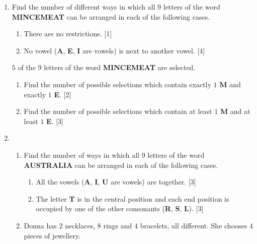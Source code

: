 	
\begin{enumerate}
	
	
	\item Find the number of different ways in which all $9$ letters of the word \textbf{MINCEMEAT} can be arranged in	each of the following cases. 
	\begin{enumerate}[label=(\roman*)]
		\item There are no restrictions.  \hfill[1]
		\item No vowel (\textbf{A}, \textbf{E}, \textbf{I} are vowels) is next to another vowel. \hfill[4]
	\end{enumerate}
    $5$ of the $9$ letters of the word \textbf{MINCEMEAT} are selected.
    \begin{enumerate}[resume,label=(\roman*)]
    	\item Find the number of possible selections which contain exactly $1$ \textbf{M} and exactly $1$ \textbf{E}. \hfill[2]
    	\item  Find the number of possible selections which contain at least $1$ \textbf{M} and at least $1$ \textbf{E}. \hfill[3]
    \end{enumerate}


   

\item  \begin{enumerate}[label=(\roman*)]
	\item Find the number of ways in which all $9$ letters of the word \textbf{AUSTRALIA} can be arranged in each of the following cases.
	
	\begin{enumerate}[label=(\alph*)]
		\item All the vowels (\textbf{A}, \textbf{I}, \textbf{U} are vowels) are together. \hfill [3]
		\item The letter \textbf{T} is in the central position and each end position is occupied by one of the other consonants (\textbf{R}, \textbf{S}, \textbf{L}). \hfill [3]
	\end{enumerate}
\item Donna has $2$ necklaces, $8$ rings and $4$ bracelets, all different. She chooses $4$ pieces of jewellery.


\end{enumerate}
\end{enumerate}
